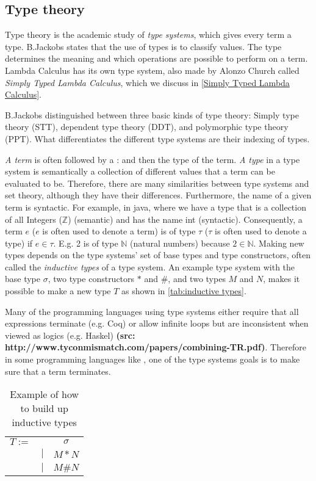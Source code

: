 \subsection{Type theory}
\label{type theory}
Type theory is the academic study of \emph{type systems}, which gives every term a type. B.Jackobs \autocite[2]{JacobsBart1999Clat} states that the use of types is to classify values. The type determines the meaning and which operations are possible to perform on a term. Lambda Calculus has its own type system, also made by Alonzo Church called \emph{Simply Typed Lambda Calculus}, which we discuss in \autoref{Simply Typed Lambda Calculus}.

\para 
B.Jackobs \autocite[3]{JacobsBart1999Clat} distinguished between three basic kinds of type theory: Simply type theory (STT), dependent type theory (DDT), and polymorphic type theory (PPT).  What differentiates the different type systems are their indexing of types.

\para
\emph{A term} is often followed by a : and then the type of the term. \emph{A type} in a type system is semantically a collection of different values that a term can be evaluated to be. Therefore, there are many similarities between type systems and set theory, although they have their differences. Furthermore, the name of a given term is syntactic. For example, in java, where we have a type that is a collection of all Integers ($\mathbb{Z}$) (semantic) and has the name int (syntactic). Consequently, a term $e$ ($e$ is often used to denote a term) is of type $\tau$ ($\tau$ is often used to denote a type) if $e \in \tau$. E.g. 2 is of type $\mathbb{N}$ (natural numbers) because $2 \in \mathbb{N}$. Making new types depends on the type systems' set of base types and type constructors, often called the \emph{inductive types} of a type system. An example type system with the base type $\sigma$, two type constructors $*$ and $\#$, and two types $M$ and $N$, makes it possible to make a new type $T$ as shown in \autoref{tab:inductive types}. 

\para
Many of the programming languages using type systems either require that all expressions terminate (e.g. Coq) or allow infinite loops but are inconsistent when viewed as logics (e.g. Haskel) \textbf{(src: http://www.tyconmismatch.com/papers/combining-TR.pdf)}. Therefore in some programming languages like , one of the type systems goals is to make sure that a term terminates. 

\begin{table}[]
    \centering
    \begin{tabular}{c c c}
         $T :=$&  & $\sigma$\\
         & $|$ & $M * N$ \\
         & $|$ & $M \# N$ \\
    \end{tabular}
    \caption{Example of how to build up inductive types}
    \label{tab:inductive types}
\end{table}


